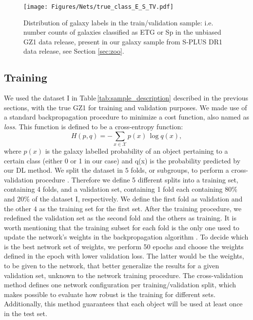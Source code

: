 \documentclass[fleqn,usenatbib]{mnras}
\begin{document}
\begin{figure}
\centering


\texttt{[image: Figures/Nets/true\_class\_E\_S\_TV.pdf]}
    \caption{
    \label{fig:HistClass}
    Distribution of galaxy labels in the train/validation sample: i.e. number counts of galaxies classified as ETG or Sp in the unbiased GZ1 data release, present in our galaxy sample from S-PLUS DR1 data release, see Section \ref{sec:zoo}.  
    }
\end{figure}

\subsection{Training}

We used the dataset I in Table\,\ref{tab:sample_description} described in the previous sections, with the true GZ1 for training and validation purposes. We made use of a standard backpropagation procedure to minimize a cost function, also named as {\it loss}. This function is defined to be a cross-entropy function:
\begin{equation}
H(p,q) = -\sum_{x\in\mathcal{X}} p(x)\, \log q(x),
\end{equation}
where $p(x)$ is the galaxy labelled probability of an object pertaining to a certain class (either 0 or 1 in our case) and q(x) is the probability predicted by our DL method.
We split the dataset in $5$ folds, or subgroups, to perform a cross-validation procedure \citep{moreno2012study}. Therefore we define 5 different splits into a training set, containing 4 folds, and a validation set, containing 1 fold each containing $80\%$ and $20\%$ of the dataset I, respectively. We define the first fold as validation and the other $4$ as the training set for the first set. After the training procedure, we redefined the validation set as the second fold and the others as training. It is worth mentioning that the training subset for each fold is the only one used to update the network's weights in the backpropagation algorithm \citep{ruder2016overview}.   
To decide which is the best network set of weights, we perform 50 epochs and choose the weights defined in the epoch with lower validation loss. The latter would be the weights, to be given to the network, that better generalize the results for a given validation set, unknown to the network training procedure.
The cross-validation method defines one network configuration per training/validation split, which makes possible to evaluate how robust is the training for different sets. Additionally, this method guarantees that each object will be used at least once in the test set.
\end{document}

